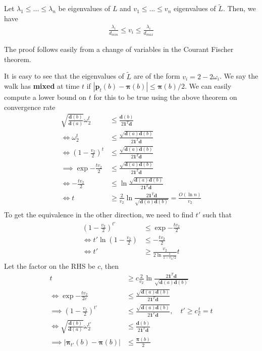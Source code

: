 \documentclass{math}
\renewcommand{\vec}[1]{\boldsymbol{#1}}
\begin{document}
\begin{lemma}
    Let $\lambda_1 \leq ... \leq \lambda_n$ be eigenvalues of $L$ and $v_1 \leq ... \leq v_n$ eigenvalues of $\widetilde{L}$.
    Then, we have
    \begin{align*}
        \frac{\lambda_i}{d_{min}} \leq v_i \leq \frac{\lambda_i}{d_{max}}
    \end{align*}
\end{lemma}

The proof follows easily from a change of variables in the Courant Fischer theorem.

It is easy to see that the eigenvalues of $\widetilde{L}$ are of the form $v_i = 2 - 2 \omega_i$.
We say the walk has \textbf{mixed} at time $t$ if $|\vec{p}_t(b) - \vec{\pi}(b)| \leq \vec{\pi}(b)/2$.
We can easily compute a lower bound on $t$ for this to be true using the above theorem on convergence rate
\begin{align*}
    \sqrt{\frac{\vec{d}(b)}{\vec{d}(a)}} \omega_2^t &\leq \frac{\vec{d}(b)}{2 \vec{1}^T \vec{d}} \\
    \iff \omega_2^t &\leq \frac{\sqrt{\vec{d}(a)\vec{d}(b)}}{2 \vec{1}^T \vec{d}} \\
    \iff \left(1 - \frac{v_2}{2}\right)^t &\leq \frac{\sqrt{\vec{d}(a)\vec{d}(b)}}{2 \vec{1}^T \vec{d}} \\
    \implies \exp{-\frac{tv_2}{2}} &\leq \frac{\sqrt{\vec{d}(a)\vec{d}(b)}}{2 \vec{1}^T \vec{d}} \\
    \iff -\frac{tv_2}{2} &\leq \ln{\frac{\sqrt{\vec{d}(a)\vec{d}(b)}}{2 \vec{1}^T \vec{d}}} \\
    \iff t &\geq \frac{2}{v_2} \ln{\frac{2 \vec{1}^T \vec{d}}{\sqrt{\vec{d}(a)\vec{d}(b)}}} = \frac{O(\ln{n})}{v_2} \\
\end{align*}
To get the equivalence in the other direction, we need to find $t'$ such that
\begin{align*}
    \left(1 - \frac{v_2}{2}\right)^{t'} &\leq \exp{-\frac{tv_2}{2}} \\
    \iff t' \ln\left(1 - \frac{v_2}{2}\right) &\leq -\frac{tv_2}{2} \\
    \iff t' &\geq \frac{v_2}{2 \ln{\frac{1}{1 - v_2/2}}} t
\end{align*}
Let the factor on the RHS be $c$, then
\begin{align*}
    t &\geq c \frac{2}{v_2} \ln{\frac{2 \vec{1}^T \vec{d}}{\sqrt{\vec{d}(a)\vec{d}(b)}}} \\
    \iff \exp{-\frac{tv_2}{2c}} &\leq \frac{\sqrt{\vec{d}(a)\vec{d}(b)}}{2 \vec{1}^T \vec{d}} \\
    \implies \left(1 - \frac{v_2}{2}\right)^{t'} &\leq \frac{\sqrt{\vec{d}(a)\vec{d}(b)}}{2 \vec{1}^T \vec{d}},\quad t' \geq c\frac{t}{c} = t \\
    \iff \sqrt{\frac{\vec{d}(b)}{\vec{d}(a)}} \omega_2^{t'} &\leq \frac{\vec{d}(b)}{2 \vec{1}^T \vec{d}} \\
    \implies |\vec{\pi}_{t'}(b) - \vec{\pi}(b)| &\leq \frac{\vec{\pi}(b)}{2}
\end{align*}
\end{document}
